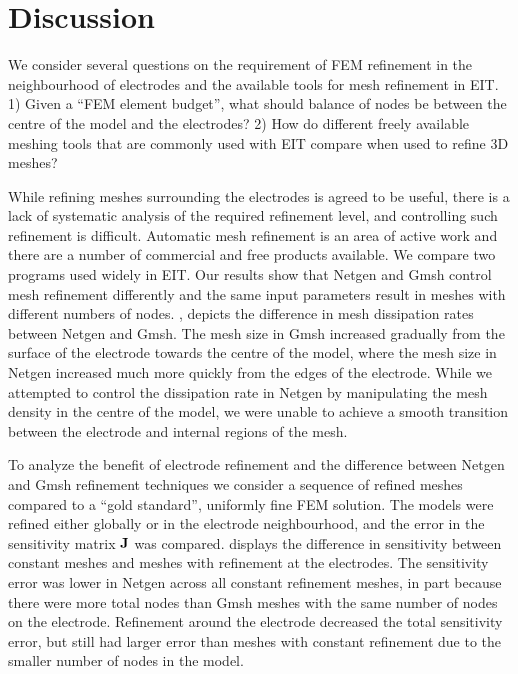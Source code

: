 \section{Discussion}

We consider several questions on the requirement of FEM refinement in the neighbourhood of
electrodes and the available tools for mesh refinement in EIT. 
1) Given a ``FEM element budget'', what should
balance of nodes be between the centre of the model and the electrodes?
2) How do different freely available meshing tools that are
commonly used with EIT compare when used to refine 3D meshes?

While refining meshes surrounding the electrodes  is agreed to be useful,
there is a lack of systematic analysis of
the required refinement level, and controlling such
refinement is difficult. Automatic mesh refinement is an area of active work and there are
a number of commercial and free products available. We compare two programs 
used widely in EIT.
Our results show that Netgen and Gmsh control mesh refinement differently 
and the same input parameters result in meshes with different numbers of nodes. 
, depicts the difference in
mesh dissipation rates between Netgen and Gmsh. The mesh size in Gmsh increased
gradually from the surface of the electrode  towards the centre of the model,
where the mesh size in Netgen increased much more quickly from the edges of the
electrode. While we attempted to control the dissipation rate in 
Netgen by manipulating the mesh density in the centre of the model, we were unable 
to achieve a smooth transition between the electrode and internal regions of the mesh. 

To analyze the benefit of electrode refinement and the difference between 
Netgen and Gmsh refinement techniques we consider
a sequence of refined meshes compared to a ``gold standard'', uniformly fine
FEM solution. The models were refined either globally or in the electrode
neighbourhood, and the error in the sensitivity matrix $\bf J$ %
was compared.  displays the difference 
in sensitivity between constant meshes and meshes with refinement at the electrodes. 
The sensitivity error was lower in Netgen across all constant refinement meshes, in
part because there were more total nodes than Gmsh meshes with the same number
of nodes on the electrode. Refinement around the electrode decreased the total 
sensitivity error, but still had larger error than meshes with constant refinement 
due to the smaller number of nodes in the model. 

